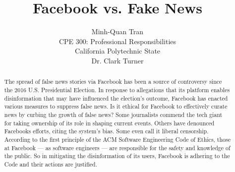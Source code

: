 

\title{\vfill Facebook vs. Fake News\\
\vspace{8pt}
\normalsize{}
}

\author{Minh-Quan Tran\\
\normalsize{CPE 300: Professional Responsibilities}\\
\normalsize{California Polytechnic State}\\
\normalsize{Dr. Clark Turner}
}

\maketitle


\vfill

\begin{abstract}
The spread of false news stories via Facebook has been a source of controversy since the 2016 U.S. Presidential Election. \cite{telegraph_fake_news} In response to allegations that its platform enables disinformation that may have influenced the election's outcome, \cite{tc_snowden_fb,stanford_fake_news_study} Facebook has enacted various measures to suppress false news. \cite{fb_reduce_clickbait,fb_addressing_hoaxes,fb_spot_fake_news} Is it ethical for Facebook to effectively curate news by curbing the growth of false news? Some journalists commend the tech giant for taking ownership of its role in shaping current events. \cite{cnn_fight} Others have denounced Facebooks efforts, citing the system's bias. \cite{vox_sentences_fn} Some even call it liberal censorship. \cite{milo_censor} According to the first principle of the ACM Software Engineering Code of Ethics, those at Facebook --- as software engineers --- are responsible for the safety and knowledge of the public. \cite{se_code} So in mitigating the disinformation of its users, Facebook is adhering to the Code and their actions are justified.
\end{abstract}

\thispagestyle{empty} 
\pagebreak